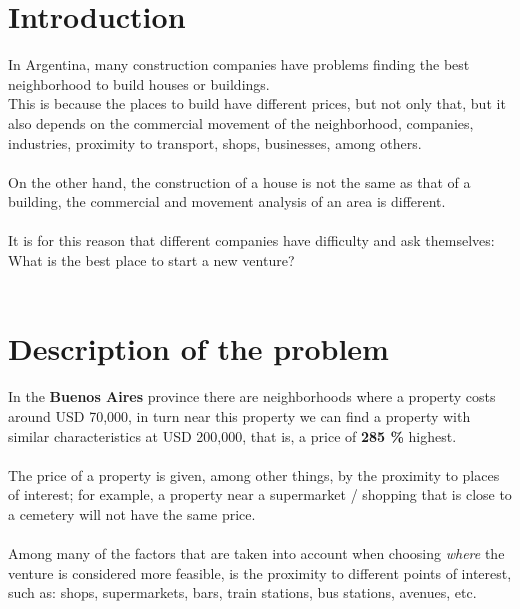 \documentclass[12pt,a4paper]{tesis}
\begin{document}

\def\autor{Christian Sebastian Russo}
\def\tituloTesis{Analysis of neighborhoods where it is convenient to build houses or buildings.}
\def\runtitulo{La Guerra de las Galaxias: Rebelión e Imperio}
\def\runtitle{Star Wars: Rebellion and Empire}
\def\director{Coursera Capstone}
\def\codirector{IBM Data Science Capstone}
\def\lugar{Buenos Aires, 2020}



\cleardoublepage
\tableofcontents

\mainmatter
\pagestyle{headings}


\chapter{Introduction}
In Argentina, many construction companies have problems finding the best neighborhood to build houses or buildings.\\
This is because the places to build have different prices, but not only that, but it also depends on the commercial movement of the neighborhood, companies, industries, proximity to transport, shops, businesses, among others.\\\ \\
On the other hand, the construction of a house is not the same as that of a building, the commercial and movement analysis of an area is different.\\ \\
It is for this reason that different companies have difficulty and ask themselves: What is the best place to start a new venture? \\ \\

\chapter{Description of the problem}
In the \textbf{Buenos Aires} province there are neighborhoods where a property costs around USD 70,000, in turn near this property we can find a property with similar characteristics at USD 200,000, that is, a price of \textbf{285 \%} highest.\\ \\
The price of a property is given, among other things, by the proximity to places of interest; for example, a property near a supermarket / shopping that is close to a cemetery will not have the same price. \\ \\
Among many of the factors that are taken into account when choosing \textit{where} the venture is considered more feasible, is the proximity to different points of interest, such as: shops, supermarkets, bars, train stations, bus stations, avenues, etc.
\end{document}
